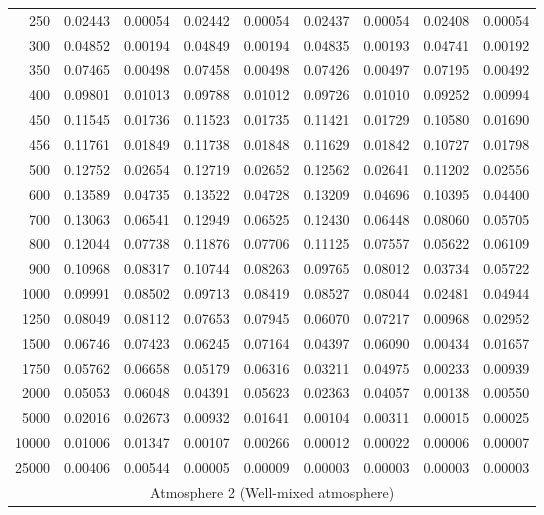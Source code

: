 \begin{table}[ht]
\begin{tabular}{r|c|c|c|c|c|c|c|c}
      250 & 0.02443 & 0.00054 & 0.02442 & 0.00054 & 0.02437 & 0.00054 & 0.02408 & 0.00054 \\
      300 & 0.04852 & 0.00194 & 0.04849 & 0.00194 & 0.04835 & 0.00193 & 0.04741 & 0.00192 \\
      350 & 0.07465 & 0.00498 & 0.07458 & 0.00498 & 0.07426 & 0.00497 & 0.07195 & 0.00492 \\
      400 & 0.09801 & 0.01013 & 0.09788 & 0.01012 & 0.09726 & 0.01010 & 0.09252 & 0.00994 \\
      450 & 0.11545 & 0.01736 & 0.11523 & 0.01735 & 0.11421 & 0.01729 & 0.10580 & 0.01690 \\
      456 & 0.11761 & 0.01849 & 0.11738 & 0.01848 & 0.11629 & 0.01842 & 0.10727 & 0.01798 \\
      500 & 0.12752 & 0.02654 & 0.12719 & 0.02652 & 0.12562 & 0.02641 & 0.11202 & 0.02556 \\
      600 & 0.13589 & 0.04735 & 0.13522 & 0.04728 & 0.13209 & 0.04696 & 0.10395 & 0.04400 \\
      700 & 0.13063 & 0.06541 & 0.12949 & 0.06525 & 0.12430 & 0.06448 & 0.08060 & 0.05705 \\
      800 & 0.12044 & 0.07738 & 0.11876 & 0.07706 & 0.11125 & 0.07557 & 0.05622 & 0.06109 \\
      900 & 0.10968 & 0.08317 & 0.10744 & 0.08263 & 0.09765 & 0.08012 & 0.03734 & 0.05722 \\
     1000 & 0.09991 & 0.08502 & 0.09713 & 0.08419 & 0.08527 & 0.08044 & 0.02481 & 0.04944 \\
     1250 & 0.08049 & 0.08112 & 0.07653 & 0.07945 & 0.06070 & 0.07217 & 0.00968 & 0.02952 \\
     1500 & 0.06746 & 0.07423 & 0.06245 & 0.07164 & 0.04397 & 0.06090 & 0.00434 & 0.01657 \\
     1750 & 0.05762 & 0.06658 & 0.05179 & 0.06316 & 0.03211 & 0.04975 & 0.00233 & 0.00939 \\
     2000 & 0.05053 & 0.06048 & 0.04391 & 0.05623 & 0.02363 & 0.04057 & 0.00138 & 0.00550 \\
     5000 & 0.02016 & 0.02673 & 0.00932 & 0.01641 & 0.00104 & 0.00311 & 0.00015 & 0.00025 \\
    10000 & 0.01006 & 0.01347 & 0.00107 & 0.00266 & 0.00012 & 0.00022 & 0.00006 & 0.00007 \\
    25000 & 0.00406 & 0.00544 & 0.00005 & 0.00009 & 0.00003 & 0.00003 & 0.00003 & 0.00003 \\ \cline{1-9}
    \multicolumn{9}{c}{Atmosphere 2 (Well-mixed atmosphere)} \\ \cline{2-9}

\end{tabular}
\end{table}
